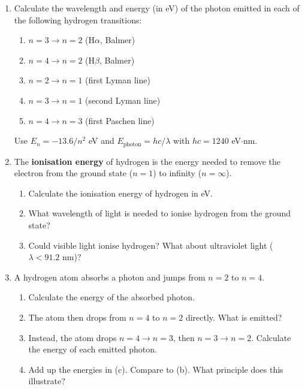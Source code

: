 \documentclass[12pt, a4paper]{book}
\begin{document}
\begin{problembox}
\begin{enumerate}[label=\textbf{\arabic*.}]
  \item Calculate the wavelength and energy (in eV) of the
        photon emitted in each of the following hydrogen transitions:
        \begin{enumerate}[label=(\alph*)]
          \item $n=3 \to n=2$ (H$\alpha$, Balmer)
          \item $n=4 \to n=2$ (H$\beta$, Balmer)
          \item $n=2 \to n=1$ (first Lyman line)
          \item $n=3 \to n=1$ (second Lyman line)
          \item $n=4 \to n=3$ (first Paschen line)
        \end{enumerate}
        Use $E_n = -13.6/n^2$ eV and $E_\text{photon} = hc/\lambda$
        with $hc = 1240$ eV$\cdot$nm.

  \item The \textbf{ionisation energy} of hydrogen is the energy
        needed to remove the electron from the ground state ($n=1$)
        to infinity ($n=\infty$).
        \begin{enumerate}[label=(\alph*)]
          \item Calculate the ionisation energy of hydrogen in eV.
          \item What wavelength of light is needed to ionise
                hydrogen from the ground state?
          \item Could visible light ionise hydrogen?
                What about ultraviolet light ($\lambda < 91.2$ nm)?
        \end{enumerate}

  \item A hydrogen atom absorbs a photon and jumps from $n=2$
        to $n=4$.
        \begin{enumerate}[label=(\alph*)]
          \item Calculate the energy of the absorbed photon.
          \item The atom then drops from $n=4$ to $n=2$ directly.
                What is emitted?
          \item Instead, the atom drops $n=4 \to n=3$,
                then $n=3 \to n=2$.
                Calculate the energy of each emitted photon.
          \item Add up the energies in (c). Compare to (b).
                What principle does this illustrate?
        \end{enumerate}


\end{enumerate}
\end{problembox}
\end{document}
